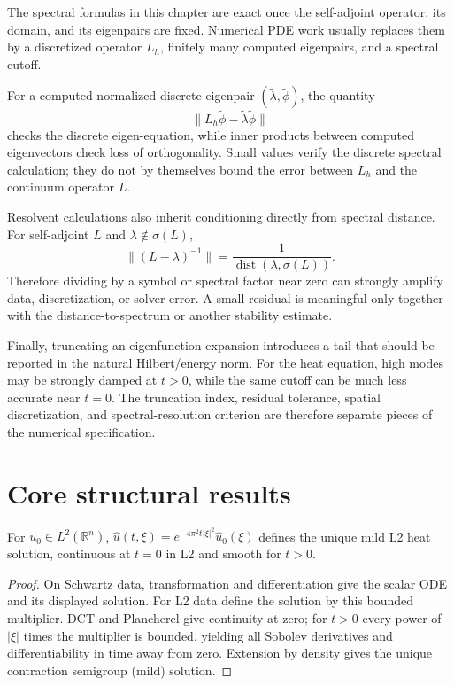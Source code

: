 \begin{remark}
The spectral formulas in this chapter are exact once the self-adjoint operator,
its domain, and its eigenpairs are fixed.  Numerical PDE work usually replaces
them by a discretized operator \(L_h\), finitely many computed eigenpairs, and
a spectral cutoff.

For a computed normalized discrete eigenpair
\((\widetilde\lambda,\widetilde\phi)\), the quantity
\[
\|L_h\widetilde\phi-\widetilde\lambda\widetilde\phi\|
\]
checks the discrete eigen-equation, while inner products between computed
eigenvectors check loss of orthogonality.  Small values verify the discrete
spectral calculation; they do not by themselves bound the error between
\(L_h\) and the continuum operator \(L\).

Resolvent calculations also inherit conditioning directly from spectral
distance.  For self-adjoint \(L\) and \(\lambda\notin\sigma(L)\),
\[
\|(L-\lambda)^{-1}\|
=
\frac{1}{\operatorname{dist}(\lambda,\sigma(L))}.
\]
Therefore dividing by a symbol or spectral factor near zero can strongly
amplify data, discretization, or solver error.  A small residual is meaningful
only together with the distance-to-spectrum or another stability estimate.

Finally, truncating an eigenfunction expansion introduces a tail that should be
reported in the natural Hilbert/energy norm.  For the heat equation, high
modes may be strongly damped at \(t>0\), while the same cutoff can be much less
accurate near \(t=0\).  The truncation index, residual tolerance, spatial
discretization, and spectral-resolution criterion are therefore separate
pieces of the numerical specification.
\end{remark}

\section{Core structural results}

\begin{theorem}\label{thm:iii28-01}
For $u_0\in L^2(\mathbb R^n)$, $\widehat u(t,\xi)=e^{-4\pi^2t|\xi|^2}\widehat u_0(\xi)$ defines the unique mild L2 heat solution, continuous at $t=0$ in L2 and smooth for $t>0$.
\begin{proof}
On Schwartz data, transformation and differentiation give the scalar ODE and its displayed solution. For L2 data define the solution by this bounded multiplier. DCT and Plancherel give continuity at zero; for $t>0$ every power of $|\xi|$ times the multiplier is bounded, yielding all Sobolev derivatives and differentiability in time away from zero. Extension by density gives the unique contraction semigroup (mild) solution.
\end{proof}
\end{theorem}

